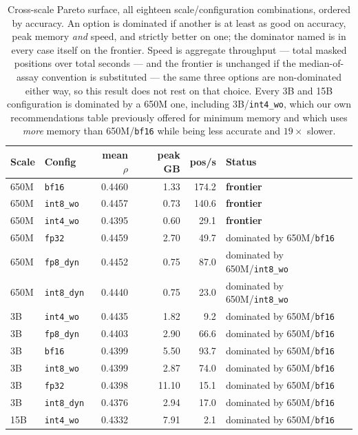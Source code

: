 \documentclass[11pt]{article}
\newcommand{\cfg}[1]{\texttt{#1}}
\begin{document}
\begin{table}[htb]
\centering
\caption{Cross-scale Pareto surface, all eighteen scale/configuration
combinations, ordered by accuracy. An option is dominated if another is at least
as good on accuracy, peak memory \emph{and} speed, and strictly better on one;
the dominator named is in every case itself on the frontier. Speed is aggregate
throughput --- total masked positions over total seconds --- and the frontier is
unchanged if the
median-of-assay convention is substituted --- the same three options are
non-dominated either way, so this result does not rest on that choice. Every 3B
and 15B configuration is dominated by a 650M one, including 3B/\cfg{int4\_wo},
which our own recommendations table previously offered for minimum memory and
which uses \emph{more} memory than 650M/\cfg{bf16} while being less accurate and
$19\times$ slower.}
\label{tab:pareto}
\small
\begin{tabular}{llrrrl}
\toprule
Scale & Config & mean $\rho$ & peak GB & pos/s & Status \\
\midrule
650M & \cfg{bf16}      & 0.4460 &  1.33 & 174.2 & \textbf{frontier} \\
650M & \cfg{int8\_wo}  & 0.4457 &  0.73 & 140.6 & \textbf{frontier} \\
650M & \cfg{int4\_wo}  & 0.4395 &  0.60 &  29.1 & \textbf{frontier} \\
\addlinespace
650M & \cfg{fp32}      & 0.4459 &  2.70 &  49.7 & dominated by 650M/\cfg{bf16} \\
650M & \cfg{fp8\_dyn}  & 0.4452 &  0.75 &  87.0 & dominated by 650M/\cfg{int8\_wo} \\
650M & \cfg{int8\_dyn} & 0.4440 &  0.75 &  23.0 & dominated by 650M/\cfg{int8\_wo} \\
\addlinespace
3B   & \cfg{int4\_wo}  & 0.4435 &  1.82 &   9.2 & dominated by 650M/\cfg{bf16} \\
3B   & \cfg{fp8\_dyn}  & 0.4403 &  2.90 &  66.6 & dominated by 650M/\cfg{bf16} \\
3B   & \cfg{bf16}      & 0.4399 &  5.50 &  93.7 & dominated by 650M/\cfg{bf16} \\
3B   & \cfg{int8\_wo}  & 0.4399 &  2.87 &  74.0 & dominated by 650M/\cfg{bf16} \\
3B   & \cfg{fp32}      & 0.4398 & 11.10 &  15.1 & dominated by 650M/\cfg{bf16} \\
3B   & \cfg{int8\_dyn} & 0.4376 &  2.94 &  17.0 & dominated by 650M/\cfg{bf16} \\
\addlinespace
15B  & \cfg{int4\_wo}  & 0.4332 &  7.91 &   2.1 & dominated by 650M/\cfg{bf16} \\

\end{tabular}
\end{table}
\end{document}
